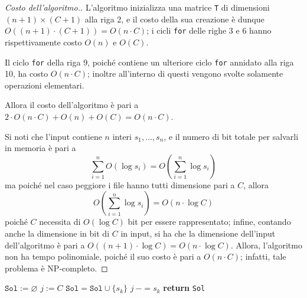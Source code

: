 \documentclass[a4paper, 12pt]{report}
\begin{document}
    \begin{proof}[Costo dell'algoritmo.]
        L'algoritmo inizializza una matrice \texttt{T} di dimensioni $(n + 1) \times (C + 1)$ alla riga 2, e il costo della sua creazione è dunque $O((n + 1) \cdot (C + 1)) = O(n \cdot C)$; i cicli \texttt{for} delle righe 3 e 6 hanno rispettivamente costo $O(n)$ e $O(C)$.

        Il ciclo \texttt{for} della riga 9, poiché contiene un ulteriore ciclo \texttt{for} annidato alla riga 10, ha costo $O(n \cdot C)$; inoltre all'interno di questi vengono svolte solamente operazioni elementari.

        Allora il costo dell'algoritmo è pari a $2 \cdot O(n \cdot C) + O(n) + O(C) = O(n \cdot C)$.

        Si noti che l'input contiene $n$ interi $s_1, \ldots, s_n$, e il numero di bit totale per salvarli in memoria è pari a $$\displaystyle \sum_{i = 1}^n{O(\log s_i)} = O \left ( \sum_{i = 1}^n{\log s_i} \right )$$ ma poiché nel caso peggiore i file hanno tutti dimensione pari a $C$, allora $$O \left ( \sum_{i = 1}^n{\log s_i} \right ) = O(n \cdot \log C)$$ poiché $C$ necessita di $O(\log C)$ bit per essere rappresentato; infine, contando anche la dimensione in bit di $C$ in input, si ha che la dimensione dell'input dell'algoritmo è pari a $O((n + 1) \cdot \log C) = O(n \cdot \log C)$. Allora, l'algoritmo non ha tempo polinomiale, poiché il suo costo è pari a $O(n \cdot C)$; infatti, tale problema è NP-completo.
    \end{proof}

    \begin{algorithm}[H]
        \caption{
            Data una lista \texttt{S} di dimensioni di $n$ file, una memoria di capacità $C$, e la matrice costruita attraverso la funzione \texttt{fileAllocation} dell'\cref{fileallocation}, l'algoritmo restituisce un insieme di file che massimizza la memoria allocata; inoltre, i file hanno tutti dimensione inferiore a $C$.\\
            \textbf{Input}: \texttt{S} lista di dimensioni di file; $C$ capacità della memoria, tale che $\forall s_i \in \texttt{S} \quad s_i \le C$; \texttt{T} matrice prodotta precedentemente.\\
            \textbf{Output}: un insieme di file che massimizza la memoria allocata.
        }

        \begin{algorithmic}[1]
            \label{fileallocation2}
                \State $\texttt{Sol} := \varnothing$
                \State $j:= C$
                 
                        \State $\texttt{Sol} = \texttt{Sol} \cup \{s_k\}$
                        \State $j \ -= s_k$
                    \EndIf
                \EndFor
                \State \textbf{return} \texttt{Sol}
            \EndFunction
        \end{algorithmic}
    \end{algorithm}
\end{document}
